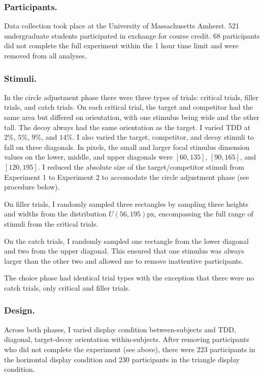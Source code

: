 \subsubsection{Participants.}
Data collection took place at the University of Massachusetts Amherst. 521 undergraduate students participated in exchange for course credit. 68 participants did not complete the full experiment within the 1 hour time limit and were removed from all analyses. 

\subsubsection{Stimuli.}
In the circle adjustment phase there were three types of trials: critical trials, filler trials, and catch trials. On each critical trial, the target and competitor had the same area but differed on orientation, with one stimulus being wide and the other tall. The decoy always had the same orientation as the target. I varied TDD at $2\%$, $5\%$, $9\%$, and $14\%$. I also varied the target, competitor, and decoy stimuli to fall on three diagonals. In pixels, the small and larger focal stimulus dimension values on the lower, middle, and upper diagonals were $[60, 135]$, $[90, 165]$, and $[120,195]$. I reduced the absolute size of the target/competitor stimuli from Experiment 1 to Experiment 2 to accomodate the circle adjustment phase (see procedure below).

On filler trials, I randomly sampled three rectangles by sampling three heights and widths from the distribution $U(56,195)$px, encompassing the full range of stimuli from the critical trials.

On the catch trials, I randomly sampled one rectangle from the lower diagonal and two from the upper diagonal. This ensured that one stimulus was always larger than the other two and allowed me to remove inattentive participants.

The choice phase had identical trial types with the exception that there were no catch trials, only critical and filler trials.

\subsubsection{Design.}
Across both phases, I varied display condition between-subjects and TDD, diagonal, target-decoy orientation within-subjects. After removing participants who did not complete the experiment (see above), there were 223 participants in the horizontal display condition and 230 participants in the triangle display condition. 


